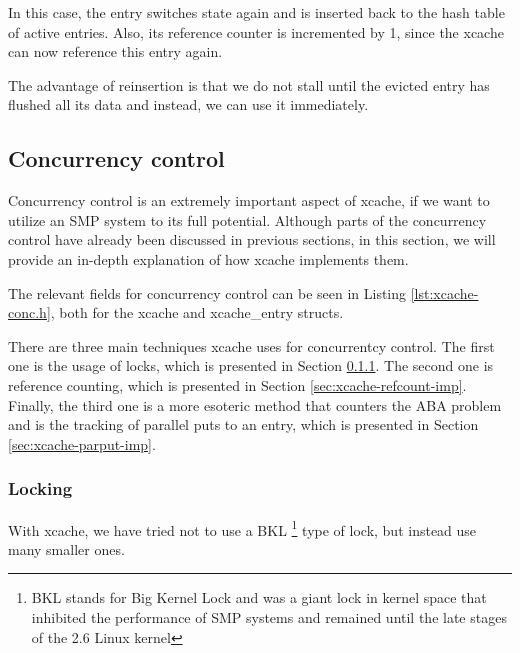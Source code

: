 In this case, the entry switches state again and is inserted back to the hash 
table of active entries. Also, its reference counter is incremented by 1, since 
the xcache can now reference this entry again.

The advantage of reinsertion is that we do not stall until the evicted entry 
has flushed all its data and instead, we can use it immediately.

\subsection{Concurrency control}\label{sec:xcache-conc-imp}

Concurrency control is an extremely important aspect of xcache, if we want to 
utilize an SMP system to its full potential. Although parts of the concurrency 
control have already been discussed in previous sections, in this section, we 
will provide an in-depth explanation of how xcache implements them.

The relevant fields for concurrency control can be seen in Listing 
\ref{lst:xcache-conc.h}, both for the xcache and xcache\_entry structs.


There are three main techniques xcache uses for concurrentcy control. The first 
one is the usage of locks, which is presented in Section 
\ref{sec:xcache-lock-imp}.  The second one is reference counting, which is 
presented in Section \ref{sec:xcache-refcount-imp}. Finally, the third one is a 
more esoteric method that counters the ABA problem and is the tracking of 
parallel puts to an entry, which is presented in Section 
\ref{sec:xcache-parput-imp}.

\subsubsection{Locking}\label{sec:xcache-lock-imp}

With xcache, we have tried not to use a BKL
\footnote{BKL stands for Big Kernel Lock and was a giant lock in kernel space 
	that inhibited the performance of SMP systems and remained until the 
	late stages of the 2.6 Linux kernel}
type of lock, but instead use many smaller ones.

